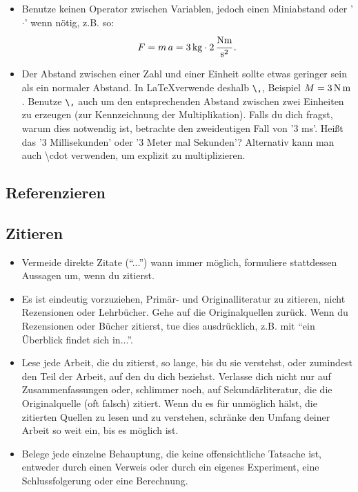 \begin{itemize}
\item Benutze keinen Operator zwischen Variablen, jedoch einen Miniabstand oder '$\cdot$' wenn nötig, z.B. so: 
\begin{align}
\label{eq:kraft}
    F = m \, a=3\,\textnormal{kg} \cdot 2\,\cfrac{\textnormal{N} \textnormal{m}}{\textnormal{s}^2} \,.
\end{align}


\item Der Abstand zwischen einer Zahl und einer Einheit sollte etwas geringer sein als ein normaler Abstand. In \LaTeX verwende deshalb \texttt{\textbackslash,}, Beispiel $M={3}\,{\textnormal{N}\,\textnormal{m}}\,$. Benutze \texttt{\textbackslash,} auch um den entsprechenden Abstand zwischen zwei Einheiten zu erzeugen (zur Kennzeichnung der Multiplikation). Falls du dich fragst, warum dies notwendig ist, betrachte den zweideutigen Fall von '3 ms'. Heißt das '3 Millisekunden' oder '3 Meter mal Sekunden'? Alternativ kann man auch \textbackslash cdot verwenden, um explizit zu multiplizieren.

\end{itemize}


\subsection{Referenzieren}

\subsection{Zitieren} 
\label{sec:zitieren}
\begin{itemize}

\item Vermeide direkte Zitate (``...'') wann immer möglich, formuliere stattdessen Aussagen um, wenn du zitierst.

\item Es ist eindeutig vorzuziehen, Primär- und Originalliteratur zu zitieren, nicht Rezensionen oder Lehrbücher. Gehe  auf die Originalquellen zurück. Wenn du Rezensionen oder Bücher zitierst, tue dies ausdrücklich, z.B. mit ``ein Überblick findet sich in...''.

\item Lese jede Arbeit, die du zitierst, so lange, bis du sie verstehst, oder zumindest den Teil der Arbeit, auf den du dich beziehst. Verlasse dich nicht nur auf Zusammenfassungen oder, schlimmer noch, auf Sekundärliteratur, die die Originalquelle (oft falsch) zitiert. Wenn du es für unmöglich hälst, die zitierten Quellen zu lesen und zu verstehen, schränke den Umfang deiner Arbeit so weit ein, bis es möglich ist.

\item Belege jede einzelne Behauptung, die keine offensichtliche Tatsache ist, entweder durch einen Verweis oder durch ein eigenes Experiment, eine Schlussfolgerung oder eine Berechnung. 

\end{itemize}
